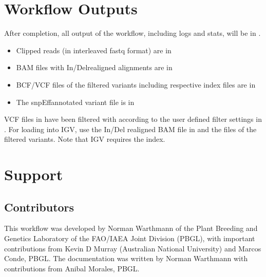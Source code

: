 \documentclass[letterpaper,10pt,english]{sphinxhowto}
\begin{document}
\section{Workflow Outputs}
\label{\detokenize{index:workflow-outputs}}
After completion, all output of the workflow, including logs and stats, will be in .
\begin{itemize}
\item {} 
Clipped reads (in interleaved fastq format) are in 

\item {} 
BAM files with In/Del\sphinxhyphen{}realigned alignments are in 

\item {} 
BCF/VCF files of the filtered variants including respective index files are in 

\item {} 
The snpEff\sphinxhyphen{}annotated variant file is in 

\end{itemize}

VCF files in  have been filtered with  according to the user defined filter settings in .
For loading into IGV, use the In/Del realigned BAM file in  and the  files of the filtered variants. Note that IGV requires the  index.


\section{Support}
\label{\detokenize{index:support}}

\subsection{Contributors}
\label{\detokenize{index:contributors}}
This workflow was developed by Norman Warthmann of the Plant Breeding and Genetics Laboratory of the FAO/IAEA Joint Division (PBGL), with important contributions from Kevin D Murray (Australian National University) and Marcos Conde, PBGL. The documentation was written by Norman Warthmann with contributions from Anibal Morales, PBGL.
\end{document}
